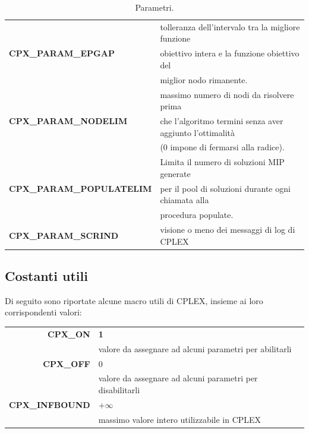\begin{table}[h]
\centering\footnotesize
\begin{tabular}{|l|l|}
\hline
\multirow{3}{*}{\textbf{CPX\_PARAM\_EPGAP}} & {tolleranza dell'intervalo tra la migliore funzione }\\
& {obiettivo intera e la funzione obiettivo del}\\
& {miglior nodo rimanente.}\\
\hline
\multirow{3}{*}{\textbf{CPX\_PARAM\_NODELIM}} & {massimo numero di nodi da risolvere prima}\\
& {che l'algoritmo termini senza aver aggiunto l'ottimalità}\\
& {(0 impone di fermarsi alla radice).}\\
\hline
\multirow{3}{*}{\textbf{CPX\_PARAM\_POPULATELIM}} & {Limita il numero di soluzioni MIP generate }\\
& {per il pool di soluzioni durante ogni chiamata alla}\\
&{procedura populate.}\\
\hline
\textbf{CPX\_PARAM\_SCRIND} & {visione o meno dei messaggi di log di CPLEX}\\
\hline
\end{tabular}
\caption{Parametri.}\label{param_table}
\end{table}
\subsection{Costanti utili}
Di seguito sono riportate alcune macro utili di CPLEX, insieme ai loro corrispondenti valori:
\begin{table}[h]
\footnotesize\centering
\begin{tabular}{|r|l|}
\hline
\textbf{CPX\_ON} & {\textbf{1}}\\
{} & {valore da assegnare ad alcuni parametri per abilitarli}\\
\hline
\textbf{CPX\_OFF} & {0}\\
{} & {valore da assegnare ad alcuni parametri per disabilitarli}\\
\hline
\textbf{CPX\_INFBOUND} & {$+\infty$}\\
{} & {massimo valore intero utilizzabile in CPLEX}\\
\hline
\end{tabular}
\end{table}

